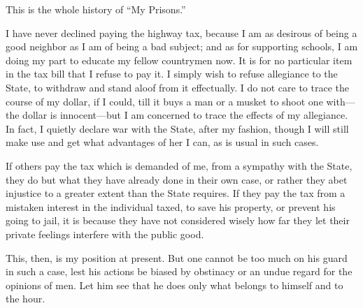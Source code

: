 \documentclass[12pt]{article}
\begin{document}
This is the whole history of ``My Prisons.''

I have never declined paying the highway tax, because I am as desirous
of being a good neighbor as I am of being a bad subject; and as for
supporting schools, I am doing my part to educate my fellow countrymen
now. It is for no particular item in the tax bill that I refuse to pay
it. I simply wish to refuse allegiance to the State, to withdraw and
stand aloof from it effectually. I do not care to trace the course of my
dollar, if I could, till it buys a man or a musket to shoot one
with---the dollar is innocent---but I am concerned to trace the effects
of my allegiance. In fact, I quietly declare war with the State, after
my fashion, though I will still make use and get what advantages of her
I can, as is usual in such cases.

If others pay the tax which is demanded of me, from a sympathy with the
State, they do but what they have already done in their own case, or
rather they abet injustice to a greater extent than the State requires.
If they pay the tax from a mistaken interest in the individual taxed, to
save his property, or prevent his going to jail, it is because they have
not considered wisely how far they let their private feelings interfere
with the public good.

This, then, is my position at present. But one cannot be too much on his
guard in such a case, lest his actions be biased by obstinacy or an
undue regard for the opinions of men. Let him see that he does only what
belongs to himself and to the hour.
\end{document}
